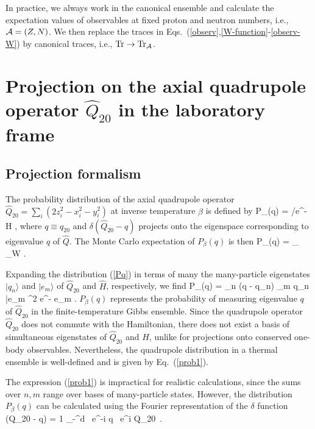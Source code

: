\documentclass[prc,twocolumn,aps,showpacs,floatfix,nofootinbib,letterpaper,preprintnumbers]{revtex4-1}
\begin{document}
In practice, we always work in the canonical ensemble and calculate the expectation values of observables at fixed proton and neutron numbers, i.e., ${\cal A} = (Z,N)$. We then replace the traces in Eqs.~(\ref{observ},\ref{W-function}-\ref{observ-W}) by canonical traces, i.e., ${\rm Tr} \to {\rm Tr}_{\cal A}$. 

\section{Projection on the axial quadrupole operator $\hat Q_{20}$ in the laboratory frame}\label{q-project}

\subsection{Projection formalism}

The probability distribution of the axial quadrupole operator 
$\hat Q_{20} = \sum_i \left(2  z_i^2 -  x_i^2 - y_i^2 \right)$ at inverse temperature $\beta$ is defined by
\be\label{Pq}
P_\beta(q)  ={ {}/\Tr e^{-\beta \hat H}} \;,
\ee
where $q \equiv q_{20}$ and $\delta({\hat Q_{20}} - q)$ projects onto the eigenspace corresponding to eigenvalue $q$ of $\hat{Q}$. The Monte Carlo expectation of $P_\beta(q)$ is then
\be\label{prob-HS}
P_\beta(q) = \left\langle \frac
{\Tr{}}
{_\sigma} \right\rangle_W  \;.
\ee

Expanding the distribution (\ref{Pq}) in terms of many the many-particle eigenstates $|q_n \rangle$ and $|e_m\rangle$  of $\hat Q_{20}$ and $\hat H$, respectively, we find
\be\label{prob1}
P_\beta(q) = \sum_n \delta(q - q_n) \sum_m \langle q_n |e_m \rangle^2 e^{-\beta
e_m} \;.
\ee
$P_\beta(q)$ represents the probability of measuring eigenvalue $q$ of $\hat{Q}_{20}$ in the finite-temperature Gibbs ensemble. Since the quadrupole operator $\hat Q_{20}$ does not commute with the Hamiltonian, there does not exist a basis of simultaneous eigenstates of $\hat Q_{20}$ and $\hat H$, unlike for projections onto conserved one-body observables.  Nevertheless, the quadrupole distribution in a thermal ensemble is well-defined and is given by Eq.~(\ref{prob1}).

The expression (\ref{prob1}) is impractical for realistic calculations, since the sums over $n,m$ range over bases of many-particle states. However, the distribution $P_\beta(q) $ can be calculated using the Fourier representation of the $\delta$ function
\be \label{delta-q}
\delta(\hat Q_{20} - q) = {1  \pi} \int_{-\infty}^\infty d \varphi \, e^{-i \varphi q }\, e^{i \varphi \hat Q_{20}} \,.
\ee
\end{document}

